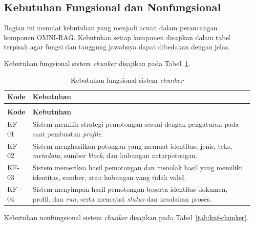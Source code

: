 \subsection{Kebutuhan Fungsional dan Nonfungsional}
\label{subsec:kebutuhan-fungsional-nonfungsional}

Bagian ini memuat kebutuhan yang menjadi acuan dalam perancangan komponen
OMNI-RAG. Kebutuhan setiap komponen disajikan dalam tabel terpisah agar fungsi
dan tanggung jawabnya dapat dibedakan dengan jelas.

\begingroup
\renewcommand{\arraystretch}{1.08}
\setlength{\tabcolsep}{4pt}

\noindent Kebutuhan fungsional sistem \emph{chunker} disajikan pada Tabel~\ref{tab:kf-chunker}.

\begin{longtable}{>{\RaggedRight\arraybackslash}p{2.2cm} >{\RaggedRight\arraybackslash}p{10.65cm}}
    \caption{Kebutuhan fungsional sistem \emph{chunker}}\label{tab:kf-chunker}\\
    \toprule
    \textbf{Kode} & \textbf{Kebutuhan}\\
    \midrule
    \endfirsthead
    \multicolumn{2}{l}{\small\itshape Lanjutan Tabel \ref{tab:kf-chunker}}\\
    \toprule
    \textbf{Kode} & \textbf{Kebutuhan}\\
    \midrule
    \endhead
    \bottomrule
    \endfoot
    KF-01 & Sistem memilih strategi pemotongan sesuai dengan pengaturan pada saat pembuatan \emph{profile}.\\
    KF-02 & Sistem menghasilkan potongan yang memuat identitas, jenis, teks, \emph{metadata}, sumber \emph{block}, dan hubungan antarpotongan.\\
    KF-03 & Sistem memeriksa hasil pemotongan dan menolak hasil yang memiliki identitas, sumber, atau hubungan yang tidak valid.\\
    KF-04 & Sistem menyimpan hasil pemotongan beserta identitas dokumen, profil, dan \emph{run}, serta mencatat \emph{status} dan kesalahan proses.\\
\end{longtable}

\noindent Kebutuhan nonfungsional sistem \emph{chunker} disajikan pada Tabel~\ref{tab:knf-chunker}.

